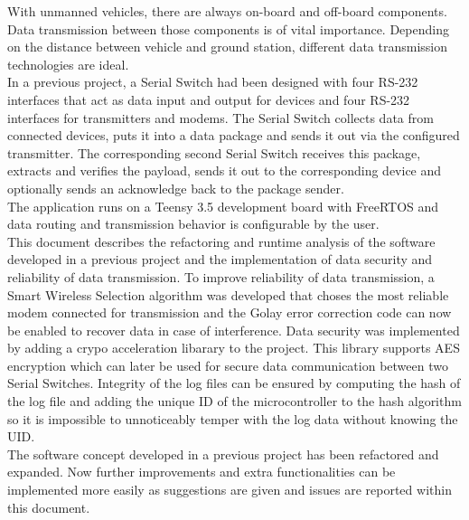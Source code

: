 %
With unmanned vehicles, there are always on-board and off-board components. Data transmission between those components is of vital importance. Depending on the distance between vehicle and ground station, different data transmission technologies are ideal.\\
In a previous project, a Serial Switch had been designed with four RS-232 interfaces that act as data input and output for devices and four RS-232 interfaces for transmitters and modems. The Serial Switch collects data from connected devices, puts it into a data package and sends it out via the configured transmitter. The corresponding second Serial Switch receives this package, extracts and verifies the payload, sends it out to the corresponding device and optionally sends an acknowledge back to the package sender.\\
The application runs on a Teensy 3.5 development board with FreeRTOS and data routing and transmission behavior is configurable by the user.\\
This document describes the refactoring and runtime analysis of the software developed in a previous project and the implementation of data security and reliability of data transmission. To improve reliability of data transmission, a Smart Wireless Selection algorithm was developed that choses the most reliable modem connected for transmission and the Golay error correction code can now be enabled to recover data in case of interference. Data security was implemented by adding a crypo acceleration libarary to the project. This library supports AES encryption which can later be used for secure data communication between two Serial Switches. Integrity of the log files can be ensured by computing the hash of the log file and adding the unique ID of the microcontroller to the hash algorithm so it is impossible to unnoticeably temper with the log data without knowing the UID.\\
The software concept developed in a previous project has been refactored and expanded. Now further improvements and extra functionalities can be implemented more easily as suggestions are given and issues are reported within this document.